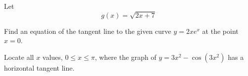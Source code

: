 \documentclass[11pt]{exam}
\begin{document}
\begin{questions}
\addpoints
\question[14] 
Let 
\[
g(x) = \sqrt{2x+7}
\]



\newpage


\addpoints
\question[15] Find an equation of the tangent line to the given curve $y = 2xe^{x}$ at the point $x=0$.
\vfill

\addpoints
\question[15] Locate all $x$ values, $0\leq x \leq \pi$, where the graph of $y = 3x^{2}-\cos{(3x^{2})}$ has a horizontal tangent line.

\vfill\vfill


\end{questions}
\end{document}
